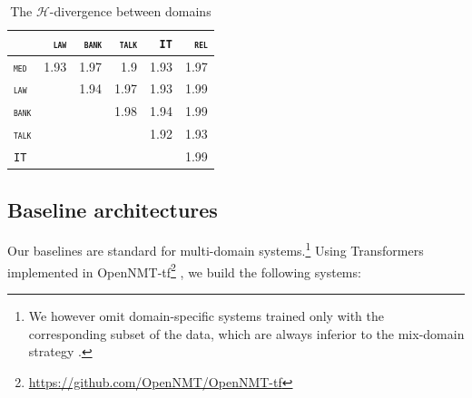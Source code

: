 \documentclass[11pt,a4paper]{article}
\newcommand{\domain}[1]{\texttt{\textsc{#1}}}
\begin{document}
\begin{table}\centering
  \begin{tabular}{|l*{5}{|r}|} 
   & \domain{law} & \domain{bank} & \domain{talk} & \domain{IT} & \domain{rel} \\ \hline
    \domain{med} &1.93 &1.97 &1.9 &1.93 &1.97 \\
    \domain{law}   && 1.94 & 1.97 &1.93 & 1.99 \\
    \domain{bank} &&&1.98 &1.94 &1.99 \\
    \domain{talk}   &&&&1.92 &1.93 \\
     \domain{IT}     &&&&& 1.99 \\ \hline
  \end{tabular}
  \caption{The $\mathcal{H}$-divergence between domains}
  \label{tab:domaindist}
\end{table}

\subsection{Baseline architectures \label{ssec:baseline}}
Our baselines are standard for multi-domain systems.\footnote{We however omit domain-specific systems trained only with the corresponding subset of the data, which are always inferior to the mix-domain strategy \cite{Britz17mixing}.} Using Transformers \cite{Vaswani17attention} implemented in OpenNMT-tf\footnote{\url{https://github.com/OpenNMT/OpenNMT-tf}} \cite{Klein17opennmt}, we build the following systems:
\end{document}
